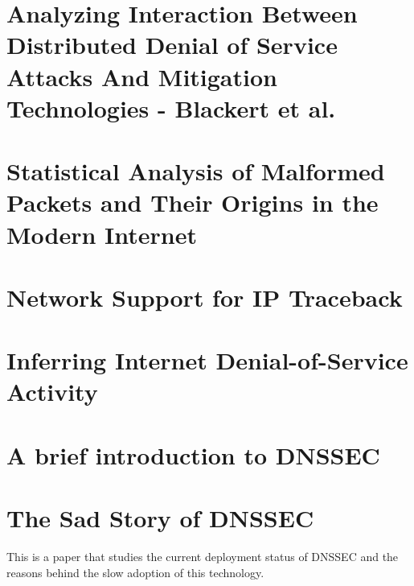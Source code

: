 \section{Analyzing Interaction Between Distributed Denial of Service Attacks And Mitigation Technologies - Blackert et al.}
\section{Statistical Analysis of Malformed Packets and Their Origins in the Modern Internet}
\section{Network Support for IP Traceback}
\section{Inferring Internet Denial-of-Service Activity}
\section{A brief introduction to DNSSEC}
\section{The Sad Story of DNSSEC}
This is a paper that studies the current deployment status of DNSSEC and the reasons behind the slow adoption of this technology. 
